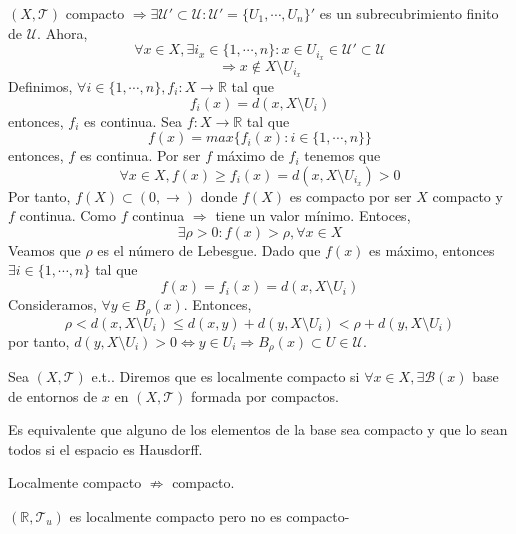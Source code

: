 \begin{dem}
  $( X, \mathcal{T} )$ compacto $\Rightarrow \exists \mathcal{U}' \subset \mathcal{U} : \mathcal{U}' = \{ U_{1}, \cdots, U_{n} \}'$ es un subrecubrimiento finito de $\mathcal{U}$. Ahora,
  \[ 
    \forall x \in X, \exists i_{x} \in \{ 1, \cdots, n \} : x \in U_{i_{x}} \in \mathcal{U}' \subset \mathcal{U}
  \]  
  \[ 
    \Rightarrow x \not \in X \setminus U_{i_{x}} 
  \] 
  Definimos, $\forall i \in \{ 1, \cdots, n \}, f_{i} :  X \to \mathbb{R}$ tal que
  \[
    f_{i}(x) = d(x, X \setminus U_{i})
  \]
  entonces, $f_{i}$ es continua. Sea $f : X \to \mathbb{R}$ tal que 
  \[ 
    f(x) = max \{ f_{i}(x) : i \in \{ 1, \cdots, n \} \} 
  \] 
  entonces, $f$ es continua. Por ser $f$ máximo de $f_{i}$ tenemos que
  \[ 
    \forall x \in X, f(x) \geq f_{i}(x) = d(x, X \setminus U_{i_{x}})  > 0
  \] 
  Por tanto, $f(X) \subset (0, \rightarrow)$ donde $f(X)$ es compacto por ser $X$ compacto y $f$ continua. Como $f$ continua $\Rightarrow$ tiene un valor mínimo. Entoces,
  \[ 
    \exists \rho > 0 : f(x) > \rho, \forall x \in X 
  \] 
  Veamos que $\rho$ es el número de Lebesgue. Dado que $f(x)$ es máximo, entonces $\exists i \in \{ 1, \cdots, n \}$ tal que
  \[ 
    f(x) = f_{i}(x) = d(x, X \setminus U_{i}) 
  \] 
  Consideramos, $\forall y \in B_{\rho}(x)$. Entonces,
  \[ 
    \rho < d(x, X \setminus U_{i}) \leq d(x, y) + d(y, X \setminus U_{i}) < \rho + d(y, X \setminus U_{i}) 
  \] 
  por tanto, $d(y, X \setminus U_{i}) > 0 \Leftrightarrow y \in U_{i} \Rightarrow B_{\rho}(x) \subset U \in \mathcal{U}$.
\end{dem}

\begin{defn}
  Sea $( X, \mathcal{T} )$ e.t.. Diremos que es localmente compacto si $\forall x \in X, \exists \mathcal{B}(x)$ base de entornos de $x$ en $( X, \mathcal{T} )$ formada por compactos.
\end{defn}

\begin{obs}
  Es equivalente que alguno de los elementos de la base sea compacto y que lo sean todos si el espacio es Hausdorff.
\end{obs}

\begin{obs}
  Localmente compacto $\not \Rightarrow$ compacto.
\end{obs}

\begin{ejm}
  $( \mathbb{R}, \mathcal{T}_{u} )$ es localmente compacto pero no es compacto-
\end{ejm}


